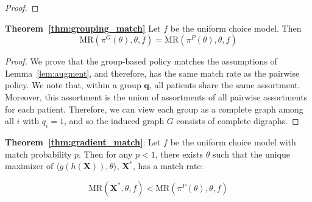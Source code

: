 \documentclass[11pt]{article}
\begin{document}
\begin{proof}
\end{proof}


\textbf{Theorem~\ref{thm:grouping_match}}
Let $f$ be the uniform choice model. Then 
\begin{equation}
    \mathrm{MR}(\pi^{G}(\theta),\theta,f) = \mathrm{MR}(\pi^{P}(\theta),\theta,f)
\end{equation} 

\begin{proof}
    
    We prove that the group-based policy matches the assumptions of Lemma~\ref{lem:augment}, and therefore, has the same match rate as the pairwise policy. 
    We note that, within a group $\mathbf{q}$, all patients share the same assortment. 
    Moreover, this assortment is the union of assortments of all pairwise assortments for each patient. 
    Therefore, we can view each group as a complete graph among all $i$ with $q_{i}=1$, and so the induced graph $G$ consists of complete digraphs. 
\end{proof}


\textbf{Theorem~\ref{thm:gradient_match}}: Let $f$ be the uniform choice model with match probability $p$. Then for any $p<1$, there exists $\theta$ such that the unique maximizer of $\langle g(h(\mathbf{X})),\theta \rangle$, $\mathbf{X}^{*}$, has a match rate: 

\begin{equation}
    \mathrm{MR}(\mathbf{X}^{*},\theta,f) < \mathrm{MR}(\pi^{P}(\theta),\theta,f)
\end{equation}
\end{document}
